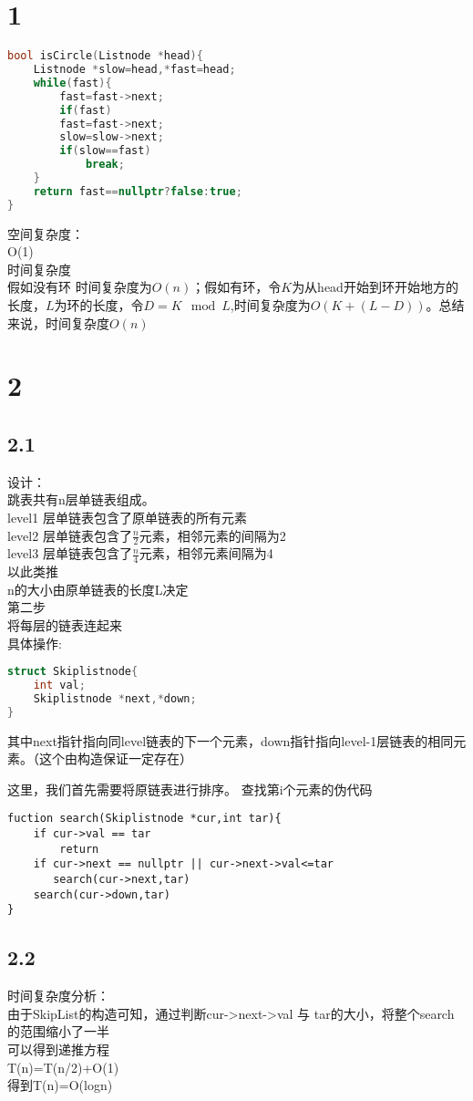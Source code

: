 \documentclass[a4paper]{article}
\begin{document}
\section*{1}
\begin{lstlisting}[language=C++]
bool isCircle(Listnode *head){
	Listnode *slow=head,*fast=head;
	while(fast){
		fast=fast->next;
		if(fast)
		fast=fast->next;
		slow=slow->next;
		if(slow==fast)
			break;
	}
	return fast==nullptr?false:true;
}

\end{lstlisting}
空间复杂度：\\
O(1)\\
时间复杂度\\
假如没有环 时间复杂度为$O(n)$；假如有环，令$K$为从head开始到环开始地方的长度，$L$为环的长度，令$D=K\mod L$,时间复杂度为$O(K+(L-D))$。总结来说，时间复杂度$O(n)$

\section*{2}
\subsection*{2.1}
设计：\\
跳表共有n层单链表组成。\\
level1 层单链表包含了原单链表的所有元素\\
level2 层单链表包含了$\frac{n}{2}$元素，相邻元素的间隔为2\\
level3 层单链表包含了$\frac{n}{4}$元素，相邻元素间隔为4\\
以此类推\\
n的大小由原单链表的长度L决定\\
第二步\\
将每层的链表连起来\\
具体操作:\\
\begin{lstlisting}[language=C++]
struct Skiplistnode{
	int val;
	Skiplistnode *next,*down;
}
\end{lstlisting}
其中next指针指向同level链表的下一个元素，down指针指向level-1层链表的相同元素。（这个由构造保证一定存在）

这里，我们首先需要将原链表进行排序。
查找第i个元素的伪代码
\begin{lstlisting}
fuction search(Skiplistnode *cur,int tar){
    if cur->val == tar
        return 
	if cur->next == nullptr || cur->next->val<=tar
	   search(cur->next,tar)
	search(cur->down,tar)
}

\end{lstlisting}
\subsection*{2.2}
时间复杂度分析：\\
由于SkipList的构造可知，通过判断cur->next->val 与 tar的大小，将整个search的范围缩小了一半\\
可以得到递推方程\\
T(n)=T(n/2)+O(1)\\
得到T(n)=O(logn)
\end{document}
